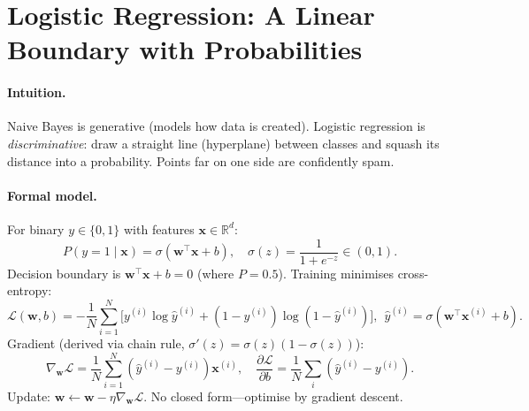 \section{Logistic Regression: A Linear Boundary with Probabilities}
\label{sec:logistic}
\paragraph{Intuition.} Naive Bayes is generative (models how data is created). Logistic regression is \emph{discriminative}: draw a straight line (hyperplane) between classes and squash its distance into a probability. Points far on one side are confidently spam.

\paragraph{Formal model.} For binary $y\in\{0,1\}$ with features $\mathbf{x}\in\mathbb{R}^d$:
\begin{equation}
P(y=1\mid\mathbf{x})=\sigma(\mathbf{w}^\top\mathbf{x}+b),\quad \sigma(z)=\frac{1}{1+e^{-z}}\in(0,1).
\end{equation}
Decision boundary is $\mathbf{w}^\top\mathbf{x}+b=0$ (where $P=0.5$). Training minimises cross-entropy:
\begin{equation}
\mathcal{L}(\mathbf{w},b)=-\frac1N\sum_{i=1}^N\Big[y^{(i)}\log\hat{y}^{(i)}+(1-y^{(i)})\log(1-\hat{y}^{(i)})\Big],\ \ \hat{y}^{(i)}=\sigma(\mathbf{w}^\top\mathbf{x}^{(i)}+b).
\end{equation}
Gradient (derived via chain rule, $\sigma'(z)=\sigma(z)(1-\sigma(z))$):
\begin{equation}
\nabla_{\mathbf{w}}\mathcal{L}=\frac1N\sum_{i=1}^N(\hat{y}^{(i)}-y^{(i)})\mathbf{x}^{(i)},\quad
\frac{\partial\mathcal{L}}{\partial b}=\frac1N\sum_i(\hat{y}^{(i)}-y^{(i)}).
\end{equation}
Update: $\mathbf{w}\gets\mathbf{w}-\eta\nabla_{\mathbf{w}}\mathcal{L}$. No closed form---optimise by gradient descent.


